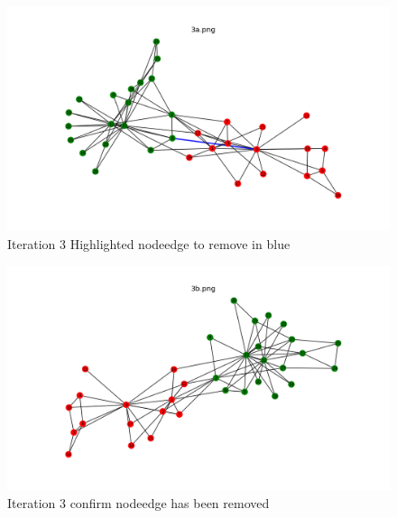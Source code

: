 \documentclass[12pt]{article}
\begin{document}
\begin{figure}[H]
\centering
\includegraphics[trim=0 0 0 0, clip, width=\textwidth] {3a.png}
\caption{Iteration 3 Highlighted nodeedge to remove in blue }
\label{fig:q13a}
\end{figure}
\begin{figure}[H]
\centering
\includegraphics[trim=0 0 0 0, clip, width=\textwidth] {3b.png}
\caption{Iteration 3 confirm nodeedge has been removed }
\label{fig:q13b}
\end{figure}
\end{document}

